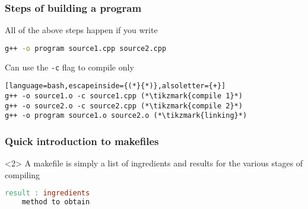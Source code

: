 \documentclass[14pt,a4paper,dvipsnames,usenames]{beamer}
\begin{document}
\begin{frame}[fragile]
  \frametitle{Steps of building a program}

  All of the above steps happen if you write

  \vspace{.5em}
  \begin{lstlisting}[language=bash,alsoletter={+}]
g++ -o program source1.cpp source2.cpp
  \end{lstlisting}

  \vspace{1em}
  Can use the \lstinline[language=bash]!-c! flag to compile only

  \vspace{.5em}
  \begin{lstlisting}[language=bash,escapeinside={(*}{*)},alsoletter={+}]
g++ -o source1.o -c source1.cpp (*\tikzmark{compile 1}*)
g++ -o source2.o -c source2.cpp (*\tikzmark{compile 2}*)
g++ -o program source1.o source2.o (*\tikzmark{linking}*)
  \end{lstlisting}

  \nointerlineskip

\end{frame}

\begin{frame}[fragile]
  \frametitle{Quick introduction to makefiles}


  \begin{onlyenv}<2>
  A makefile is simply a list of ingredients and results for the various stages of compiling

  \vspace{.5em}
  \begin{lstlisting}[language=make,basicstyle=\ttfamily]
result : ingredients
    method to obtain
  \end{lstlisting}
  \end{onlyenv}
  
\end{frame}
\end{document}
